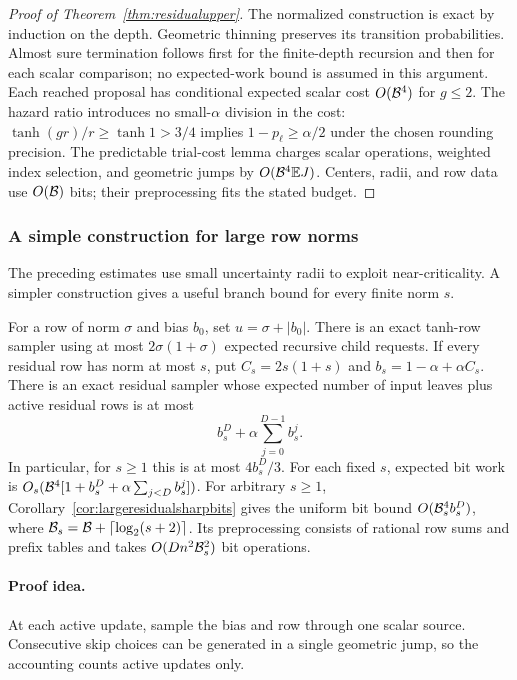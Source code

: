 \begin{proof}[Proof of Theorem~\ref{thm:residualupper}]
The normalized construction is exact by induction on the depth.
Geometric thinning preserves its transition probabilities.
Almost sure termination follows first for the finite-depth
recursion and then for each scalar comparison; no expected-work
bound is assumed in this argument.
Each reached proposal has conditional expected scalar cost
$O(\mathcal B^4)$ for $g\le2$. The hazard ratio introduces no small-$\alpha$
division in the cost: $\tanh(gr)/r\ge\tanh1>3/4$ implies
$1-p_\ell\ge\alpha/2$ under the chosen rounding precision.
The predictable trial-cost lemma charges scalar operations,
weighted index selection, and geometric jumps by $O(\mathcal B^4\mathbb E J)$.
Centers, radii, and row data use $O(\mathcal B)$ bits; their preprocessing
fits the stated budget.
\end{proof}

\subsubsection{A simple construction for large row norms}

The preceding estimates use small uncertainty radii to exploit
near-criticality. A simpler construction gives a useful branch
bound for every finite norm $s$.

\begin{proposition}
\label{prop:largerow}
For a row of norm $\sigma$ and bias $b_0$, set
$u=\sigma+|b_0|$. There is an exact tanh-row sampler using at
most $2\sigma(1+\sigma)$ expected recursive child requests.
If every residual row has norm at most $s$, put
$C_s=2s(1+s)$ and $b_s=1-\alpha+\alpha C_s$.
There is an exact residual sampler whose expected number of
input leaves plus active residual rows is at most
\begin{equation}\label{eq:largeresidual}
b_s^D+\alpha\sum_{j=0}^{D-1}b_s^j.
\end{equation}
In particular, for $s\ge1$ this is at most $4b_s^D/3$.
For each fixed $s$, expected bit work is
$O_s(\mathcal B^4[1+b_s^D+\alpha\sum_{j<D}b_s^j])$.
For arbitrary $s\ge1$, Corollary~\ref{cor:largeresidualsharpbits}
gives the uniform bit bound $O(\mathcal B_s^4b_s^D)$, where
$\mathcal B_s=\mathcal B+\lceil\log_2(s+2)\rceil$.
Its preprocessing consists of rational row sums and prefix tables
and takes $O(Dn^2\mathcal B_s^2)$ bit operations.
\end{proposition}
\paragraph{Proof idea.}
At each active update, sample the bias and row through one scalar source.
Consecutive skip choices can be generated in a single geometric jump, so the
accounting counts active updates only.

